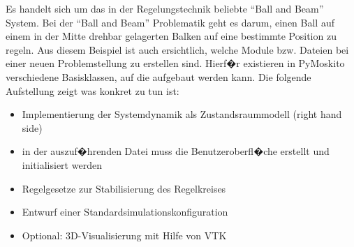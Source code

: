 \documentclass[a4paper]{scrartcl}
\begin{document}
Es handelt sich um das in der Regelungstechnik beliebte "`Ball and Beam"' System. Bei der "`Ball and Beam"' Problematik geht es darum, einen Ball auf einem in der Mitte drehbar gelagerten Balken auf eine bestimmte Position zu regeln. Aus diesem Beispiel ist auch ersichtlich, welche Module bzw. Dateien bei einer neuen Problemstellung zu erstellen sind. Hierf�r existieren in PyMoskito verschiedene Basisklassen, auf die aufgebaut werden kann. 
Die folgende Aufstellung zeigt was konkret zu tun ist:
\begin{itemize}
	\item Implementierung der Systemdynamik als Zustandsraummodell (right hand side)
	\item in der auszuf�hrenden Datei muss die Benutzeroberfl�che erstellt und initialisiert werden
	\item Regelgesetze zur Stabilisierung des Regelkreises
	\item Entwurf einer Standardsimulationskonfiguration
	\item Optional: 3D-Visualisierung mit Hilfe von VTK
\end{itemize}
\end{document}
